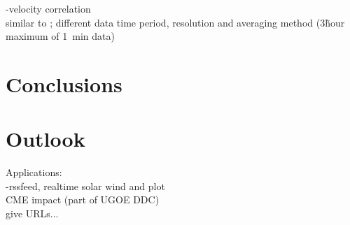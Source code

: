 \Kp-velocity correlation\\
similar to \citet{Elliott2013}; different data time period, resolution and averaging method (3\~hour maximum of 1~min data)\\


\section{Conclusions}

\section{Outlook}

Applications:\\
\Kp-rssfeed, realtime solar wind and \Kp{} plot\\
CME \Kp{} impact (part of UGOE DDC)\\
give URLs...\\
